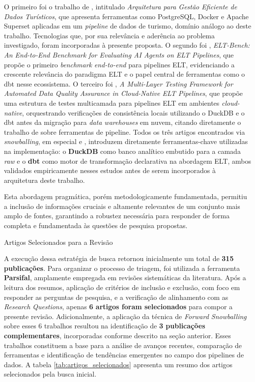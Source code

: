 O primeiro foi o trabalho de \cite{figueira2025arquitetura}, intitulado \textit{Arquitetura para Gestão Eficiente de Dados Turísticos}, que apresenta ferramentas como PostgreSQL, Docker e Apache Superset aplicadas em um \textit{pipeline} de dados de turismo, domínio análogo ao deste trabalho. Tecnologias que, por sua relevância e aderência ao problema investigado, foram incorporadas à presente proposta. O segundo foi \cite{jin2025elt}, \textit{ELT-Bench: An End-to-End Benchmark for Evaluating AI Agents on ELT Pipelines}, que propõe o primeiro \textit{benchmark} \textit{end-to-end} para pipelines ELT, evidenciando a crescente relevância do paradigma ELT e o papel central de ferramentas como o dbt nesse ecossistema. O terceiro foi \cite{gargouri2026multi}, \textit{A Multi-Layer Testing Framework for Automated Data Quality Assurance in Cloud-Native ELT Pipelines}, que propõe uma estrutura de testes multicamada para pipelines ELT em ambientes \textit{cloud-native}, orquestrando verificações de consistência locais utilizando o DuckDB e o dbt antes da migração para \textit{data warehouses} em nuvem, citando diretamente o trabalho de \cite{mbata2024survey} sobre ferramentas de pipeline. Todos os três artigos encontrados via \textit{snowballing}, em especial \cite{gargouri2026multi} e \cite{jin2025elt}, introduzem diretamente ferramentas-chave utilizadas na implementação: o \textbf{DuckDB} como banco analítico embutido para a camada \textit{raw} e o \textbf{dbt} como motor de transformação declarativa na abordagem ELT, ambos validados empiricamente nesses estudos antes de serem incorporados à arquitetura deste trabalho.

Esta abordagem pragmática, porém metodologicamente fundamentada, permitiu a inclusão de informações cruciais e altamente relevantes de um conjunto mais amplo de fontes, garantindo a robustez necessária para responder de forma completa e fundamentada às questões de pesquisa propostas.

\begin{subsection}{Artigos Selecionados para a Revisão}
    
    A execução dessa estratégia de busca retornou inicialmente um total de \textbf{315 publicações}. Para organizar o processo de triagem, foi utilizada a ferramenta \textbf{Parsifal}, amplamente empregada em revisões sistemáticas da literatura. Após a leitura dos resumos, aplicação de critérios de inclusão e exclusão, com foco em responder as perguntas de pesquisa, e a verificação de alinhamento com as \textit{Research Questions}, apenas \textbf{6 artigos foram selecionados} para compor a presente revisão. Adicionalmente, a aplicação da técnica de \textit{Forward Snowballing} \cite[]{felizardo2016using} sobre esses 6 trabalhos resultou na identificação de \textbf{3 publicações complementares}, incorporadas conforme descrito na seção anterior. Esses trabalhos constituem a base para a análise de avanços recentes, comparação de ferramentas e identificação de tendências emergentes no campo dos pipelines de dados. A tabela \ref{tab:artigos_selecionados} apresenta um resumo dos artigos selecionados pela busca inicial.



\end{subsection}

